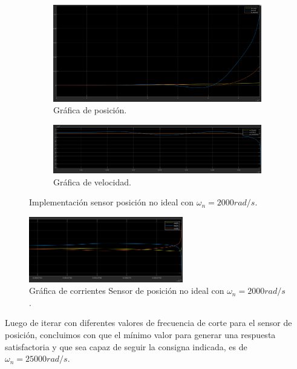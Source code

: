 \documentclass{article}
\begin{document}
\begin{figure}[H]
    \centering
    \begin{subfigure}[t]{0.4\textwidth}
        \centering
        \includegraphics[width=\textwidth]{Imagenes/1_posNI_2000_p.png}
        \caption{Gráfica de posición.}
    \end{subfigure}
    \begin{subfigure}[t]{0.5\textwidth}
        \centering
        \includegraphics[width=\textwidth]{Imagenes/2_posNI_2000_w.png}
        \caption{Gráfica de velocidad.}
    \end{subfigure}
    \caption{Implementación sensor posición no ideal con $\omega_n = 2000 rad/s$.}
\end{figure}

\begin{figure}[H]
    \centering
    \includegraphics[width=0.6\textwidth]{Imagenes/3_posNI_2000_c.png}
    \caption{Gráfica de corrientes Sensor de posición no ideal con $\omega_n = 2000 rad/s$.}
\end{figure}

 Luego de iterar con diferentes valores de frecuencia de corte para el sensor de posición, concluimos con que el
 mínimo valor para generar una respuesta satisfactoria y que sea capaz de
 seguir la consigna indicada, es de $\omega_n = 25000 rad/s$. 
\end{document}
